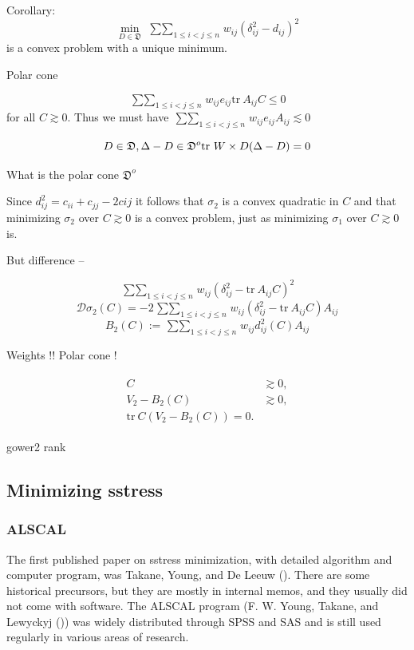\documentclass[
  12pt,
  letterpaper,
  DIV=11,
  numbers=noendperiod]{scrreprt}
\theoremstyle{remark}
\begin{document}
Corollary:
\[\min_{D\in\mathfrak{D}}\ \mathop{\sum\sum}_{1\leq i<j\leq n}w_{ij}(\delta_{ij}^2-d_{ij})^2\]
is a convex problem with a unique minimum.

Polar cone

\[
\mathop{\sum\sum}_{1\leq i<j\leq n} w_{ij}e_{ij}\text{tr}\ A_{ij}C\leq 0
\] for all \(C\gtrsim 0\). Thus we must have
\(\mathop{\sum\sum}_{1\leq i<j\leq n} w_{ij}e_{ij}A_{ij}\lesssim 0\)

\[
D\in\mathfrak{D},\\
\Delta-D\in\mathfrak{D}^o\\
\text{tr}\ W\times D(\Delta-D)=0
\]

What is the polar cone \(\mathfrak{D}^o\)

Since \(d_{ij}^2=c_{ii}+c_{jj}-2c{ij}\) it follows that \(\sigma_2\) is
a convex quadratic in \(C\) and that minimizing \(\sigma_2\) over
\(C\gtrsim 0\) is a convex problem, just as minimizing \(\sigma_1\) over
\(C\gtrsim 0\) is.

But difference --

\[
\mathop{\sum\sum}_{1\leq i<j\leq n}w_{ij}(\delta_{ij}^2-\text{tr}\ A_{ij}C)^2
\] \[
\mathcal{D}\sigma_2(C)=-2\mathop{\sum\sum}_{1\leq i<j\leq n}w_{ij}(\delta_{ij}^2-\text{tr}\ A_{ij}C)A_{ij}
\] \[
B_2(C):=\mathop{\sum\sum}_{1\leq i<j\leq n}w_{ij}d_{ij}^2(C)A_{ij}
\]

Weights !! Polar cone !

\begin{align}
\begin{split}
C&\gtrsim 0,\\
V_2-B_2(C)&\gtrsim 0,\\
\text{tr}\ C(V_2-B_2(C))=0.
\end{split}
\end{align}

gower2 rank

\subsection{Minimizing sstress}\label{minimizing-sstress}

\subsubsection{ALSCAL}\label{alscal}

The first published paper on sstress minimization, with detailed
algorithm and computer program, was Takane, Young, and De Leeuw
(). There are some
historical precursors, but they are mostly in internal memos, and they
usually did not come with software. The ALSCAL program (F. W. Young,
Takane, and Lewyckyj ())
was widely distributed through SPSS and SAS and is still used regularly
in various areas of research.
\end{document}

